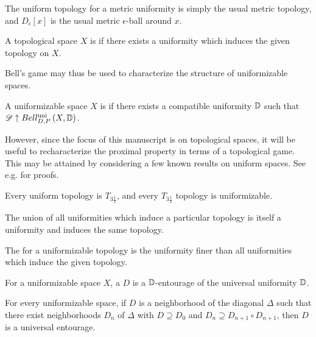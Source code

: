 The uniform topology for a metric uniformity is simply the usual metric
topology, and $D_\epsilon[x]$ is the usual metric $\epsilon$-ball around $x$.

\begin{defn}
  A topological space $X$ is  if there exists
  a uniformity which induces the given topology on $X$.
\end{defn}

Bell's game may thus be used to characterize the structure of uniformizable
spaces.

\begin{defn}
  A uniformizable space $X$ is  if there exists a compatible
  uniformity $\mathbb{D}$ such that $\mathscr{D}\uparrow Bell_{D,P}^{\textrm{uni}}\left({X,\mathbb{D}}\right)$.
\end{defn}

However, since the focus of this manuscript is on topological spaces,
it will be useful to recharacterize the proximal property in terms of a
topological game. This may be attained by considering a few known results on
uniform spaces. See e.g. \cite{MR2048350} for proofs.

\begin{thm}
  Every uniform topology is $T_{3\frac{1}{2}}$, and
  every $T_{3\frac{1}{2}}$ topology is uniformizable.
\end{thm}

\begin{thm}
  The union of all uniformities which induce a particular topology is itself
  a uniformity and induces the same topology.
\end{thm}

\begin{defn}
  The  for a uniformizable topology is the uniformity
  finer than all uniformities which induce the given topology.
\end{defn}

\begin{defn}
  For a uniformizable space $X$, a  $D$ is a
  $\mathbb{D}$-entourage of the universal uniformity $\mathbb{D}$.
\end{defn}

\begin{thm}
  For every uniformizable space, if $D$ is a neighborhood of the diagonal
  $\Delta$  such that there exist neighborhoods $D_n$ of $\Delta$ with
  $D\supseteq D_0$ and $D_n \supseteq D_{n+1}\circ D_{n+1}$, then $D$ is a
  universal entourage.
\end{thm}

